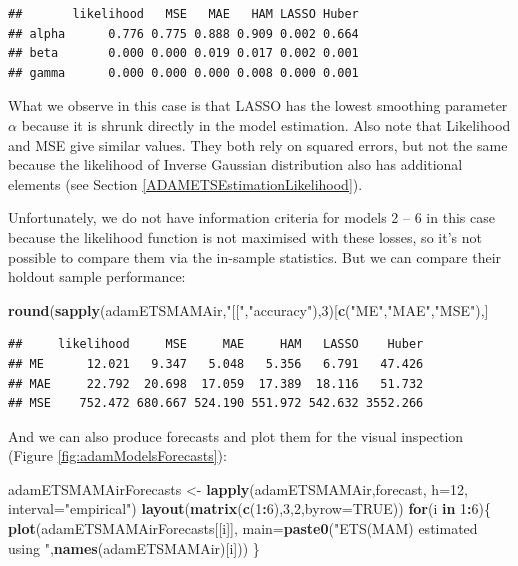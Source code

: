 \documentclass[]{book}
\newenvironment{Shaded}{\begin{snugshade}}{\end{snugshade}}
\newcommand{\ControlFlowTok}[1]{\textcolor[rgb]{0.13,0.29,0.53}{\textbf{#1}}}
\newcommand{\DataTypeTok}[1]{\textcolor[rgb]{0.13,0.29,0.53}{#1}}
\newcommand{\DecValTok}[1]{\textcolor[rgb]{0.00,0.00,0.81}{#1}}
\newcommand{\KeywordTok}[1]{\textcolor[rgb]{0.13,0.29,0.53}{\textbf{#1}}}
\newcommand{\NormalTok}[1]{#1}
\newcommand{\OperatorTok}[1]{\textcolor[rgb]{0.81,0.36,0.00}{\textbf{#1}}}
\newcommand{\OtherTok}[1]{\textcolor[rgb]{0.56,0.35,0.01}{#1}}
\newcommand{\StringTok}[1]{\textcolor[rgb]{0.31,0.60,0.02}{#1}}
\theoremstyle{definition}
\theoremstyle{definition}
\theoremstyle{definition}
\theoremstyle{definition}
\theoremstyle{remark}
\begin{document}
\begin{verbatim}
##       likelihood   MSE   MAE   HAM LASSO Huber
## alpha      0.776 0.775 0.888 0.909 0.002 0.664
## beta       0.000 0.000 0.019 0.017 0.002 0.001
## gamma      0.000 0.000 0.000 0.008 0.000 0.001
\end{verbatim}

What we observe in this case is that LASSO has the lowest smoothing parameter \(\alpha\) because it is shrunk directly in the model estimation. Also note that Likelihood and MSE give similar values. They both rely on squared errors, but not the same because the likelihood of Inverse Gaussian distribution also has additional elements (see Section \ref{ADAMETSEstimationLikelihood}).

Unfortunately, we do not have information criteria for models 2 -- 6 in this case because the likelihood function is not maximised with these losses, so it's not possible to compare them via the in-sample statistics. But we can compare their holdout sample performance:

\begin{Shaded}
\begin{Highlighting}[]
\KeywordTok{round}\NormalTok{(}\KeywordTok{sapply}\NormalTok{(adamETSMAMAir,}\StringTok{"[["}\NormalTok{,}\StringTok{"accuracy"}\NormalTok{),}\DecValTok{3}\NormalTok{)[}\KeywordTok{c}\NormalTok{(}\StringTok{"ME"}\NormalTok{,}\StringTok{"MAE"}\NormalTok{,}\StringTok{"MSE"}\NormalTok{),]}
\end{Highlighting}
\end{Shaded}

\begin{verbatim}
##     likelihood     MSE     MAE     HAM   LASSO    Huber
## ME      12.021   9.347   5.048   5.356   6.791   47.426
## MAE     22.792  20.698  17.059  17.389  18.116   51.732
## MSE    752.472 680.667 524.190 551.972 542.632 3552.266
\end{verbatim}

And we can also produce forecasts and plot them for the visual inspection (Figure \ref{fig:adamModelsForecasts}):

\begin{Shaded}
\begin{Highlighting}[]
\NormalTok{adamETSMAMAirForecasts <-}\StringTok{ }\KeywordTok{lapply}\NormalTok{(adamETSMAMAir,forecast,}
                                 \DataTypeTok{h=}\DecValTok{12}\NormalTok{, }\DataTypeTok{interval=}\StringTok{"empirical"}\NormalTok{)}
\KeywordTok{layout}\NormalTok{(}\KeywordTok{matrix}\NormalTok{(}\KeywordTok{c}\NormalTok{(}\DecValTok{1}\OperatorTok{:}\DecValTok{6}\NormalTok{),}\DecValTok{3}\NormalTok{,}\DecValTok{2}\NormalTok{,}\DataTypeTok{byrow=}\OtherTok{TRUE}\NormalTok{))}
\ControlFlowTok{for}\NormalTok{(i }\ControlFlowTok{in} \DecValTok{1}\OperatorTok{:}\DecValTok{6}\NormalTok{)\{}
    \KeywordTok{plot}\NormalTok{(adamETSMAMAirForecasts[[i]],}
         \DataTypeTok{main=}\KeywordTok{paste0}\NormalTok{(}\StringTok{"ETS(MAM) estimated using "}\NormalTok{,}\KeywordTok{names}\NormalTok{(adamETSMAMAir)[i]))}
\NormalTok{\}}
\end{Highlighting}
\end{Shaded}
\end{document}
